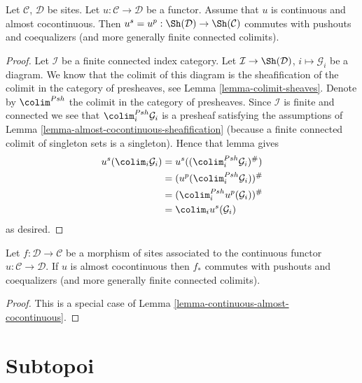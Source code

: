 \begin{lemma}
\label{lemma-continuous-almost-cocontinuous}
Let $\mathcal{C}$, $\mathcal{D}$ be sites.
Let $u : \mathcal{C} \to \mathcal{D}$ be a functor.
Assume that $u$ is continuous and almost cocontinuous.
Then $u^s = u^p : \Sh(\mathcal{D}) \to \Sh(\mathcal{C})$
commutes with pushouts and coequalizers (and more generally
finite connected colimits).
\end{lemma}

\begin{proof}
Let $\mathcal{I}$ be a finite connected index category.
Let $\mathcal{I} \to \Sh(\mathcal{D})$,
$i \mapsto \mathcal{G}_i$ be a diagram. We know that the colimit of
this diagram is the sheafification of the colimit in the category of
presheaves, see
Lemma \ref{lemma-colimit-sheaves}.
Denote by $\colim^{Psh}$ the colimit in the category
of presheaves. Since $\mathcal{I}$ is finite and connected
we see that $\colim^{Psh}_i \mathcal{G}_i$
is a presheaf satisfying the assumptions of
Lemma \ref{lemma-almost-cocontinuous-sheafification}
(because a finite connected colimit of singleton sets is a
singleton). Hence that lemma gives
\begin{align*}
u^s(\colim_i \mathcal{G}_i) & =
u^s((\colim^{Psh}_i \mathcal{G}_i)^\#) \\
& = (u^p(\colim^{Psh}_i \mathcal{G}_i))^\# \\
& = (\colim^{Psh}_i u^p(\mathcal{G}_i))^\# \\
& = \colim_i u^s(\mathcal{G}_i)
\end{align*}
as desired.
\end{proof}

\begin{lemma}
\label{lemma-morphism-of-sites-almost-cocontinuous}
Let $f : \mathcal{D} \to \mathcal{C}$ be a morphism of sites
associated to the continuous functor $u : \mathcal{C} \to \mathcal{D}$.
If $u$ is almost cocontinuous then $f_*$ commutes with
pushouts and coequalizers (and more generally finite connected colimits).
\end{lemma}

\begin{proof}
This is a special case of Lemma \ref{lemma-continuous-almost-cocontinuous}.
\end{proof}








\section{Subtopoi}
\label{section-subtopoi}

